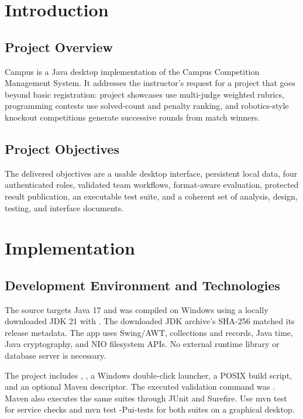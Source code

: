 \section{Introduction}
\subsection{Project Overview}
Campus is a Java desktop implementation of the Campus Competition Management System. It addresses the instructor's request for a project that goes beyond basic registration: project showcases use multi-judge weighted rubrics, programming contests use solved-count and penalty ranking, and robotics-style knockout competitions generate successive rounds from match winners.
\subsection{Project Objectives}
The delivered objectives are a usable desktop interface, persistent local data, four authenticated roles, validated team workflows, format-aware evaluation, protected result publication, an executable test suite, and a coherent set of analysis, design, testing, and interface documents.

\section{Implementation}
\subsection{Development Environment and Technologies}
The source targets Java 17 and was compiled on Windows using a locally downloaded JDK 21 with . The downloaded JDK archive's SHA-256 matched its release metadata. The app uses Swing/AWT, collections and records, Java time, Java cryptography, and NIO filesystem APIs. No external runtime library or database server is necessary.

The project includes , , a Windows double-click launcher, a POSIX build script, and an optional Maven descriptor. The executed validation command was . Maven also executes the same suites through JUnit and Surefire. Use mvn test for service checks and mvn test -Pui-tests for both suites on a graphical desktop.
